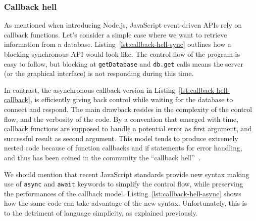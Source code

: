 


\subsubsection{Callback hell}%
\label{ssub:callback_hell}

As mentioned when introducing Node.js,
JavaScript event-driven APIs rely on callback functions.
Let's consider a simple case where we want to retrieve information
from a database.
Listing~\ref{lst:callback-hell-sync} outlines how a blocking synchronous API
would look like.
The control flow of the program is easy to follow,
but blocking at \verb|getDatabase| and \verb|db.get| calls
means the server (or the graphical interface) is not responding
during this time.



In contrast, the asynchronous callback version
in Listing~\ref{lst:callback-hell-callback},
is efficiently giving back control while waiting for the
database to connect and respond.
The main drawback resides in the complexity of the control flow,
and the verbosity of the code.
By a convention that emerged with time,
callback functions are supposed to handle a potential error
as first argument, and successful result as second argument.
This model tends to produce extremely nested code because of
function callbacks and if statements for error handling,
and thus has been coined in the community the ``callback hell''~\cite{callback-hell}.



We should mention that recent JavaScript standards provide new syntax
making use of \verb|async| and \verb|await| keywords to simplify
the control flow, while preserving the performances of
the callback model.
Listing~\ref{lst:callback-hell-async} shows how the same code can take advantage of the new syntax.
Unfortunately, this is to the detriment of language simplicity,
as explained previously.



